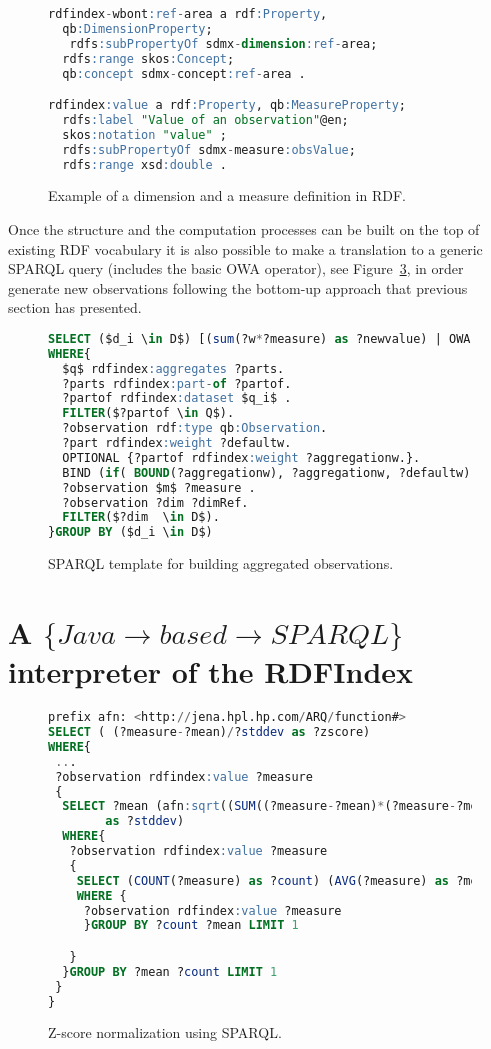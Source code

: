 \documentclass{llncs}
\begin{document}
\begin{figure}[!ht]
\begin{lstlisting}[language=SQL]  
rdfindex-wbont:ref-area a rdf:Property, 
  qb:DimensionProperty; 
   rdfs:subPropertyOf sdmx-dimension:ref-area; 
  rdfs:range skos:Concept; 
  qb:concept sdmx-concept:ref-area . 

rdfindex:value a rdf:Property, qb:MeasureProperty;
  rdfs:label "Value of an observation"@en;
  skos:notation "value" ;
  rdfs:subPropertyOf sdmx-measure:obsValue;
  rdfs:range xsd:double . 
\end{lstlisting}
\caption{Example of a dimension and a measure definition in RDF.}
 \label{fig:results-rdf-properties}
\end{figure}


Once the structure and the computation processes can be built on the top of existing RDF vocabulary it is also 
possible to make a translation to a generic SPARQL query (includes the basic OWA operator), see Figure~\ref{fig:results-rdf-sparql-template}, in order generate new observations following the bottom-up approach that previous section has presented.

\begin{figure}[!ht]
\begin{lstlisting}[language=SQL,mathescape]  
SELECT ($d_i \in D$) [(sum(?w*?measure) as ?newvalue) | OWA(?measure)]
WHERE{
  $q$ rdfindex:aggregates ?parts.
  ?parts rdfindex:part-of ?partof.
  ?partof rdfindex:dataset $q_i$ .
  FILTER($?partof \in Q$).  
  ?observation rdf:type qb:Observation.
  ?part rdfindex:weight ?defaultw.     
  OPTIONAL {?partof rdfindex:weight ?aggregationw.}.
  BIND (if( BOUND(?aggregationw), ?aggregationw, ?defaultw) AS ?w)
  ?observation $m$ ?measure . 
  ?observation ?dim ?dimRef. 
  FILTER($?dim  \in D$).
}GROUP BY ($d_i \in D$)
\end{lstlisting}
\caption{SPARQL template for building aggregated observations.}
 \label{fig:results-rdf-sparql-template}
\end{figure}


\section{A $\{Java\rightarrow based \rightarrow SPARQL\}$  interpreter of the RDFIndex}
%

\begin{figure}[!ht]
\begin{lstlisting}[language=SQL,mathescape]  
prefix afn: <http://jena.hpl.hp.com/ARQ/function#>
SELECT ( (?measure-?mean)/?stddev as ?zscore) 
WHERE{
 ...
 ?observation rdfindex:value ?measure 
 {
  SELECT ?mean (afn:sqrt((SUM((?measure-?mean)*(?measure-?mean))/?count)) 
		as ?stddev) 
  WHERE{ 
   ?observation rdfindex:value ?measure 
   {
    SELECT (COUNT(?measure) as ?count) (AVG(?measure) as ?mean)
    WHERE {
     ?observation rdfindex:value ?measure 
     }GROUP BY ?count ?mean LIMIT 1

   }	
  }GROUP BY ?mean ?count LIMIT 1
 }
}
\end{lstlisting}
\caption{Z-score normalization using SPARQL.}
 \label{fig:results-rdf-sparql-template}
\end{figure}
\end{document}
